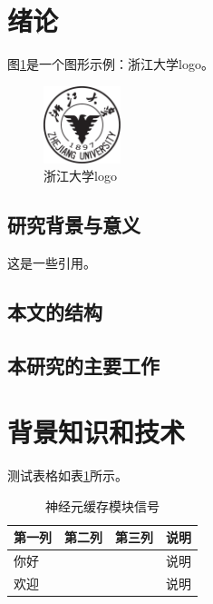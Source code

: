 
\section{绪论}

图\ref{fig:zjulogo}是一个图形示例：浙江大学logo。

\begin{figure}[H]
    \includegraphics[width=0.2\textwidth]{figure/zjulogo.pdf}
    \caption[short]{浙江大学logo}
    \label{fig:zjulogo}
\end{figure}

\subsection{研究背景与意义}

这是一些引用\citep{exampleReference}。

\subsection{本文的结构}


\subsection{本研究的主要工作}



\clearpage
\section{背景知识和技术}

测试表格如表\ref{tab:test}所示。

\begin{table}[htbp]
    \wuhao\songti
    \centering
    \begin{tabular}{lllp{7cm}}
        \toprule
        第一列             & 第二列     & 第三列                    & 说明                           \\
        \midrule
        你好  &  &     & 说明 \\
        欢迎 &  &  & 说明              \\
        \bottomrule
    \end{tabular}
    \caption{神经元缓存模块信号}
    \label{tab:test}
\end{table}


